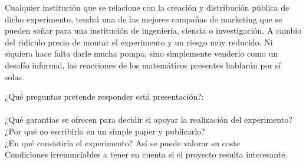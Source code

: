 \noindent
Cualquier institución que se relacione con la creación y distribución pública de dicho experimento, tendrá una de las mejores campañas de marketing que se pueden soñar para una institución de ingeniería, ciencia o investigación. A cambio del ridículo precio de montar el experimento y un riesgo muy reducido. Ni siquiera hace falta darle mucha pompa, sino simplemente venderlo como un desafío informal, las reacciones de los matemáticos presentes hablarán por sí solas.

\newpage
\noindent
¿Qué preguntas pretende responder está presentación?:\\\\
¿Qué garantías se ofrecen para decidir si apoyar la realización del experimento?\\
¿Por qué no escribirlo en un simple paper y publicarlo?\\
¿En qué consistiría el experimento? Así se puede valorar su coste\\
Condiciones irrenunciables a tener en cuenta si el proyecto resulta interesante.
